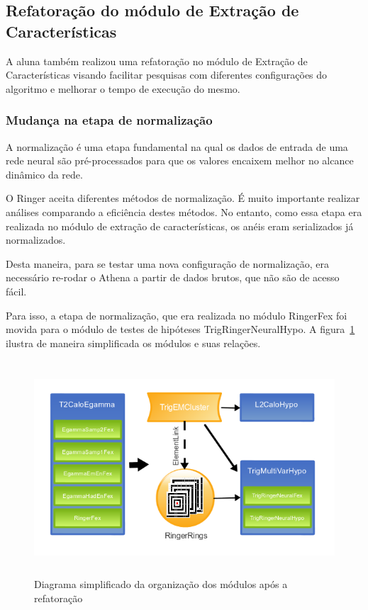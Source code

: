 \documentclass[a4paper,10pt,titlepage]{article}
\begin{document}
\clearpage

\subsection{Refatoração do módulo de Extração de Características}

A aluna também realizou uma refatoração no módulo de Extração de Características visando facilitar pesquisas com diferentes configurações do algoritmo e melhorar o tempo de execução do mesmo.

\subsubsection{Mudança na etapa de normalização}

A normalização é uma etapa fundamental na qual os dados de entrada de uma rede neural são pré-processados para que os valores encaixem melhor no alcance dinâmico da rede.

O Ringer aceita diferentes métodos de normalização.
É muito importante realizar análises comparando a eficiência destes métodos.
No entanto, como essa etapa era realizada no módulo de extração de características, os anéis eram serializados já normalizados.

Desta maneira, para se testar uma nova configuração de normalização, era necessário re-rodar o Athena a partir de dados brutos, que não são de acesso fácil.

Para isso, a etapa de normalização, que era realizada no módulo RingerFex foi movida para o módulo de testes de hipóteses TrigRingerNeuralHypo. A figura~\ref{fig:move_normalization} ilustra de maneira simplificada os módulos e suas relações.

\begin{figure}[htbp!]
 \centering
 \includegraphics[width=12cm,height=8cm]{Figs/egamma_refactoring/move_normalization.png}
 \caption{Diagrama simplificado da organização dos módulos após a refatoração}
 \label{fig:move_normalization}
\end{figure}
\end{document}
